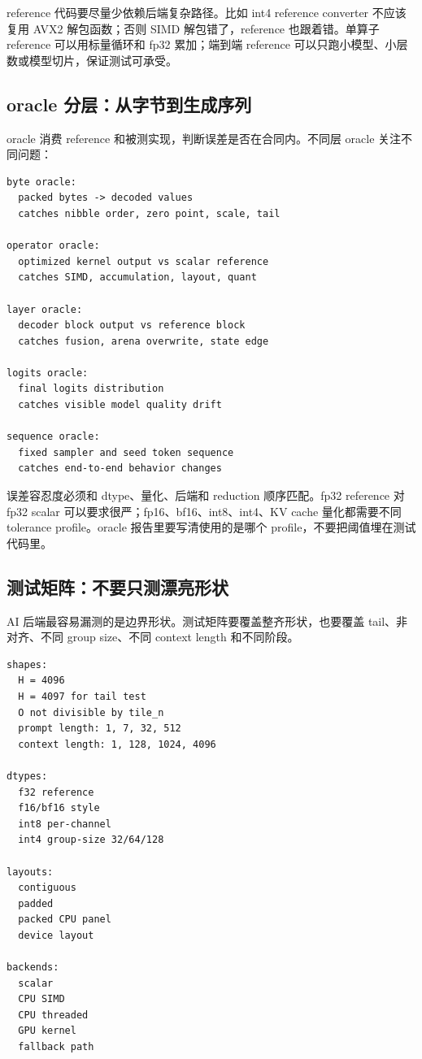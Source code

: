 reference 代码要尽量少依赖后端复杂路径。比如 int4 reference converter 不应该复用 AVX2 解包函数；否则 SIMD 解包错了，reference 也跟着错。单算子 reference 可以用标量循环和 fp32 累加；端到端 reference 可以只跑小模型、小层数或模型切片，保证测试可承受。

\subsection{oracle 分层：从字节到生成序列}

oracle 消费 reference 和被测实现，判断误差是否在合同内。不同层 oracle 关注不同问题：

\begin{lstlisting}[numbers=none,caption={oracle 层次与定位能力}]
byte oracle:
  packed bytes -> decoded values
  catches nibble order, zero point, scale, tail

operator oracle:
  optimized kernel output vs scalar reference
  catches SIMD, accumulation, layout, quant

layer oracle:
  decoder block output vs reference block
  catches fusion, arena overwrite, state edge

logits oracle:
  final logits distribution
  catches visible model quality drift

sequence oracle:
  fixed sampler and seed token sequence
  catches end-to-end behavior changes
\end{lstlisting}

误差容忍度必须和 dtype、量化、后端和 reduction 顺序匹配。fp32 reference 对 fp32 scalar 可以要求很严；fp16、bf16、int8、int4、KV cache 量化都需要不同 tolerance profile。oracle 报告里要写清使用的是哪个 profile，不要把阈值埋在测试代码里。

\subsection{测试矩阵：不要只测漂亮形状}

AI 后端最容易漏测的是边界形状。测试矩阵要覆盖整齐形状，也要覆盖 tail、非对齐、不同 group size、不同 context length 和不同阶段。

\begin{lstlisting}[numbers=none,caption={后端测试矩阵示例}]
shapes:
  H = 4096
  H = 4097 for tail test
  O not divisible by tile_n
  prompt length: 1, 7, 32, 512
  context length: 1, 128, 1024, 4096

dtypes:
  f32 reference
  f16/bf16 style
  int8 per-channel
  int4 group-size 32/64/128

layouts:
  contiguous
  padded
  packed CPU panel
  device layout

backends:
  scalar
  CPU SIMD
  CPU threaded
  GPU kernel
  fallback path
\end{lstlisting}

